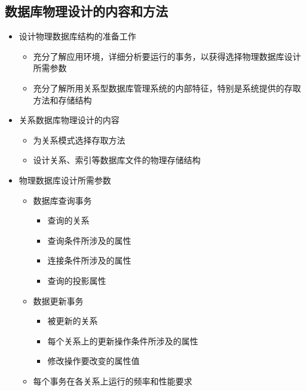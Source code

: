 \subsection{数据库物理设计的内容和方法}
\begin{itemize}
    \item 设计物理数据库结构的准备工作
    \begin{itemize}
        \item 充分了解应用环境，详细分析要运行的事务，以获得选择物理数据库设计所需参数
        \item 充分了解所用关系型数据库管理系统的内部特征，特别是系统提供的存取方法和存储结构
    \end{itemize}
    \item 关系数据库物理设计的内容
    \begin{itemize}
        \item 为关系模式选择存取方法
        \item 设计关系、索引等数据库文件的物理存储结构
    \end{itemize}
    \item 物理数据库设计所需参数
    \begin{itemize}
        \item 数据库查询事务
        \vspace{-0.8em}
        \begin{multicols}{2}
            \begin{itemize}
                \item 查询的关系
                \item 查询条件所涉及的属性
                \item 连接条件所涉及的属性
                \item 查询的投影属性
            \end{itemize}
        \end{multicols}
        \vspace{-1em}
        \item 数据更新事务
        \begin{itemize}
            \item 被更新的关系
            \item 每个关系上的更新操作条件所涉及的属性
            \item 修改操作要改变的属性值
        \end{itemize}
        \item 每个事务在各关系上运行的频率和性能要求
    \end{itemize}
\end{itemize}

